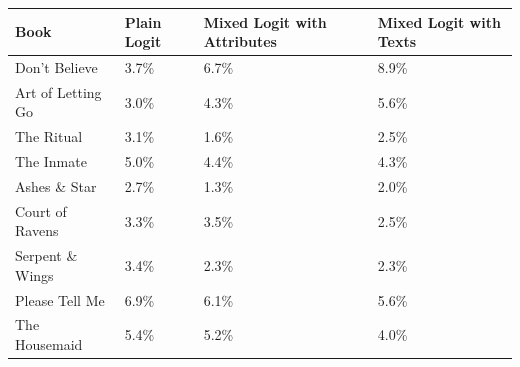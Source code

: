 \begin{centering}
\begin{tabular}{>{\raggedright}p{5cm}>{\raggedright}p{2cm}>{\centering}p{2cm}>{\centering}p{2cm}}
\hline
{\footnotesize\textbf{Book}} & {\footnotesize\textbf{Plain Logit}} & {\footnotesize\textbf{Mixed Logit with Attributes}} & {\footnotesize\textbf{Mixed Logit with Texts}}\tabularnewline
\hline
{\footnotesize Don't Believe} & {\footnotesize 3.7\%} & {\footnotesize 6.7\%} & {\footnotesize 8.9\%}\tabularnewline
{\footnotesize Art of Letting Go} & {\footnotesize 3.0\%} & {\footnotesize 4.3\%} & {\footnotesize 5.6\%}\tabularnewline
{\footnotesize The Ritual} & {\footnotesize 3.1\%} & {\footnotesize 1.6\%} & {\footnotesize 2.5\%}\tabularnewline
{\footnotesize The Inmate} & {\footnotesize 5.0\%} & {\footnotesize 4.4\%} & {\footnotesize 4.3\%}\tabularnewline
{\footnotesize Ashes \& Star} & {\footnotesize 2.7\%} & {\footnotesize 1.3\%} & {\footnotesize 2.0\%}\tabularnewline
{\footnotesize Court of Ravens} & {\footnotesize 3.3\%} & {\footnotesize 3.5\%} & {\footnotesize 2.5\%}\tabularnewline
{\footnotesize Serpent \& Wings} & {\footnotesize 3.4\%} & {\footnotesize 2.3\%} & {\footnotesize 2.3\%}\tabularnewline
{\footnotesize Please Tell Me} & {\footnotesize 6.9\%} & {\footnotesize 6.1\%} & {\footnotesize 5.6\%}\tabularnewline
{\footnotesize The Housemaid} & {\footnotesize 5.4\%} & {\footnotesize 5.2\%} & {\footnotesize 4.0\%}\tabularnewline
\hline
\end{tabular}
\par\end{centering}